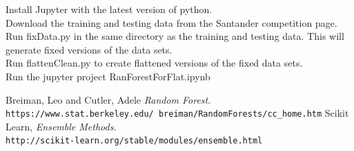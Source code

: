 \documentclass[10pt]{article}
\begin{document}
Install Jupyter with the latest version of python. \\
Download the training and testing data from the Santander competition page. \\
Run fixData.py in the same directory as the training and testing data. This will generate fixed versions of the data sets. \\
Run flattenClean.py to create flattened versions of the fixed data sets. \\
Run the jupyter project RanForestForFlat.ipynb \\

\begin{thebibliography}{9}
Breiman, Leo and Cutler, Adele 
\textit{Random Forest}. 
\\\texttt{https://www.stat.berkeley.edu/~breiman/RandomForests/cc\_home.htm}
Scikit Learn,
\textit{Ensemble Methods}. 
\\\texttt{http://scikit-learn.org/stable/modules/ensemble.html}
\end{thebibliography}
\end{document}
